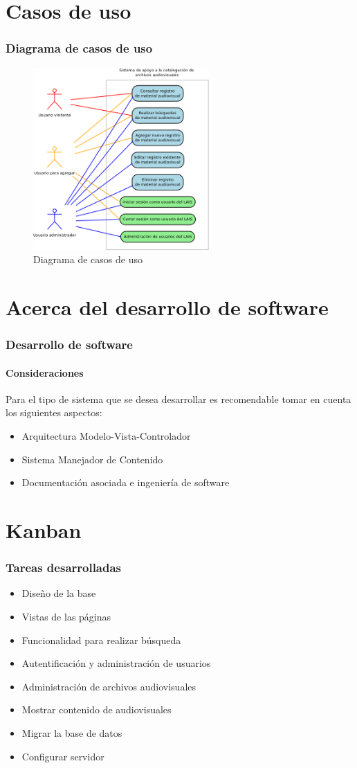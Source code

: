 \documentclass{beamer}
\begin{document}
\section{Casos de uso}
\begin{frame}
	\frametitle{Diagrama de casos de uso}
	\begin{figure}[H]
		\centering
		\includegraphics[width=0.6\textwidth]{CasosDeUso.png}
		\caption{Diagrama de casos de uso}
		\label{fig:caso_de_uso}
	\end{figure}
\end{frame}

\section{Acerca del desarrollo de software}
\begin{frame}
	\frametitle{Desarrollo de software}
	\framesubtitle{Consideraciones}
	Para el tipo de sistema que se desea desarrollar es recomendable tomar en cuenta los siguientes aspectos:
	\begin{itemize}
		\item Arquitectura Modelo-Vista-Controlador
		\item Sistema Manejador de Contenido
		\item Documentación asociada e ingeniería de software
	\end{itemize}
\end{frame}

\section{Kanban}
\begin{frame}
	\frametitle{Tareas desarrolladas}
	\begin{itemize}
		\item Diseño de la base
		\item Vistas de las páginas
		\item Funcionalidad para realizar búsqueda
		\item Autentificación y administración de usuarios
		\item Administración de archivos audiovisuales
		\item Mostrar contenido de audiovisuales
		\item Migrar la base de datos
		\item Configurar servidor
	\end{itemize}
\end{frame}
\end{document}
